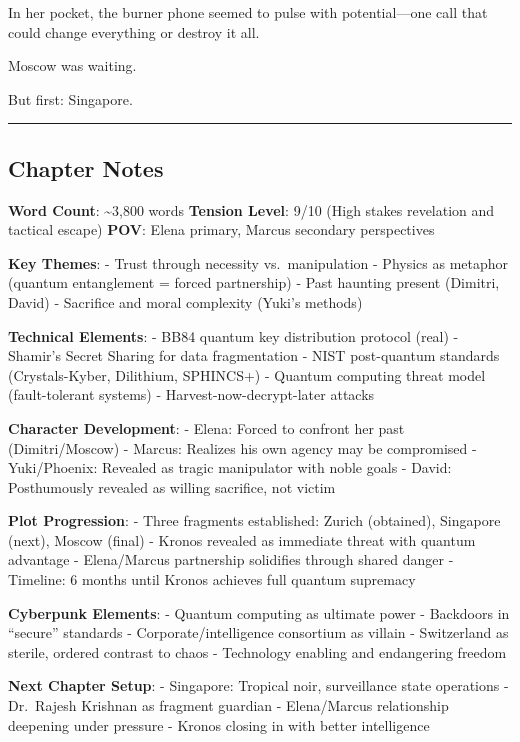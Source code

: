 In her pocket, the burner phone seemed to pulse with potential---one
call that could change everything or destroy it all.

Moscow was waiting.

But first: Singapore.

\begin{center}\rule{0.5\linewidth}{0.5pt}\end{center}

\hypertarget{chapter-notes}{%
\subsection{Chapter Notes}\label{chapter-notes}}

\textbf{Word Count}: \textasciitilde3,800 words \textbf{Tension Level}:
9/10 (High stakes revelation and tactical escape) \textbf{POV}: Elena
primary, Marcus secondary perspectives

\textbf{Key Themes}: - Trust through necessity vs.~manipulation -
Physics as metaphor (quantum entanglement = forced partnership) - Past
haunting present (Dimitri, David) - Sacrifice and moral complexity
(Yuki's methods)

\textbf{Technical Elements}: - BB84 quantum key distribution protocol
(real) - Shamir's Secret Sharing for data fragmentation - NIST
post-quantum standards (Crystals-Kyber, Dilithium, SPHINCS+) - Quantum
computing threat model (fault-tolerant systems) -
Harvest-now-decrypt-later attacks

\textbf{Character Development}: - Elena: Forced to confront her past
(Dimitri/Moscow) - Marcus: Realizes his own agency may be compromised -
Yuki/Phoenix: Revealed as tragic manipulator with noble goals - David:
Posthumously revealed as willing sacrifice, not victim

\textbf{Plot Progression}: - Three fragments established: Zurich
(obtained), Singapore (next), Moscow (final) - Kronos revealed as
immediate threat with quantum advantage - Elena/Marcus partnership
solidifies through shared danger - Timeline: 6 months until Kronos
achieves full quantum supremacy

\textbf{Cyberpunk Elements}: - Quantum computing as ultimate power -
Backdoors in ``secure'' standards - Corporate/intelligence consortium as
villain - Switzerland as sterile, ordered contrast to chaos - Technology
enabling and endangering freedom

\textbf{Next Chapter Setup}: - Singapore: Tropical noir, surveillance
state operations - Dr.~Rajesh Krishnan as fragment guardian -
Elena/Marcus relationship deepening under pressure - Kronos closing in
with better intelligence
